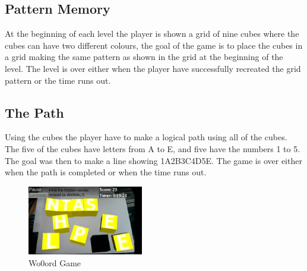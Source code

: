 	

\subsection{Pattern Memory}
\label{game:pattern_memory}
At the beginning of each level the player is shown a grid of nine cubes where the cubes can have two different colours, the goal of the game is to place the cubes in a grid making the same pattern as shown in the grid at the beginning of the level. The level is over either when the player have successfully recreated the grid pattern or the time runs out.

	

\subsection{The Path}
\label{game:the_path}
Using the cubes the player have to make a logical path using all of the cubes. The five of the cubes have letters from A to E, and five have the numbers 1 to 5. The goal was then to make a line showing 1A2B3C4D5E. The game is over either when the path is completed or when the time runs out.


\begin{figure}
	\capstart
	\centering
		\vspace{-20px}
		\includegraphics[width=0.45\textwidth]{images/Wo0ords_screenshot.jpg}
		\vspace{-10pt}
		\caption{Wo0ord Game}
		\label{fig:Costas_wo0ords}
		\vspace{-20pt}
\end{figure}


